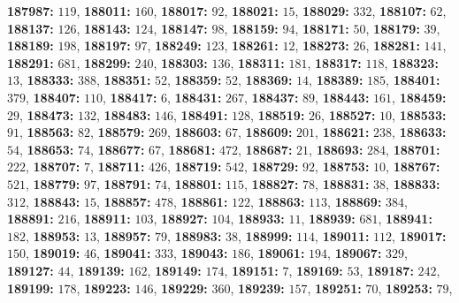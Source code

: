 \textsf{\bfseries 187987:} $119$, \textsf{\bfseries 188011:} $160$, \textsf{\bfseries 188017:} $92$, \textsf{\bfseries 188021:} $15$, \textsf{\bfseries 188029:} $332$, \textsf{\bfseries 188107:} $62$, \textsf{\bfseries 188137:} $126$, \textsf{\bfseries 188143:} $124$, \textsf{\bfseries 188147:} $98$, \textsf{\bfseries 188159:} $94$, \textsf{\bfseries 188171:} $50$, \textsf{\bfseries 188179:} $39$, \textsf{\bfseries 188189:} $198$, \textsf{\bfseries 188197:} $97$, \textsf{\bfseries 188249:} $123$, \textsf{\bfseries 188261:} $12$, \textsf{\bfseries 188273:} $26$, \textsf{\bfseries 188281:} $141$, \textsf{\bfseries 188291:} $681$, \textsf{\bfseries 188299:} $240$, \textsf{\bfseries 188303:} $136$, \textsf{\bfseries 188311:} $181$, \textsf{\bfseries 188317:} $118$, \textsf{\bfseries 188323:} $13$, \textsf{\bfseries 188333:} $388$, \textsf{\bfseries 188351:} $52$, \textsf{\bfseries 188359:} $52$, \textsf{\bfseries 188369:} $14$, \textsf{\bfseries 188389:} $185$, \textsf{\bfseries 188401:} $379$, \textsf{\bfseries 188407:} $110$, \textsf{\bfseries 188417:} $6$, \textsf{\bfseries 188431:} $267$, \textsf{\bfseries 188437:} $89$, \textsf{\bfseries 188443:} $161$, \textsf{\bfseries 188459:} $29$, \textsf{\bfseries 188473:} $132$, \textsf{\bfseries 188483:} $146$, \textsf{\bfseries 188491:} $128$, \textsf{\bfseries 188519:} $26$, \textsf{\bfseries 188527:} $10$, \textsf{\bfseries 188533:} $91$, \textsf{\bfseries 188563:} $82$, \textsf{\bfseries 188579:} $269$, \textsf{\bfseries 188603:} $67$, \textsf{\bfseries 188609:} $201$, \textsf{\bfseries 188621:} $238$, \textsf{\bfseries 188633:} $54$, \textsf{\bfseries 188653:} $74$, \textsf{\bfseries 188677:} $67$, \textsf{\bfseries 188681:} $472$, \textsf{\bfseries 188687:} $21$, \textsf{\bfseries 188693:} $284$, \textsf{\bfseries 188701:} $222$, \textsf{\bfseries 188707:} $7$, \textsf{\bfseries 188711:} $426$, \textsf{\bfseries 188719:} $542$, \textsf{\bfseries 188729:} $92$, \textsf{\bfseries 188753:} $10$, \textsf{\bfseries 188767:} $521$, \textsf{\bfseries 188779:} $97$, \textsf{\bfseries 188791:} $74$, \textsf{\bfseries 188801:} $115$, \textsf{\bfseries 188827:} $78$, \textsf{\bfseries 188831:} $38$, \textsf{\bfseries 188833:} $312$, \textsf{\bfseries 188843:} $15$, \textsf{\bfseries 188857:} $478$, \textsf{\bfseries 188861:} $122$, \textsf{\bfseries 188863:} $113$, \textsf{\bfseries 188869:} $384$, \textsf{\bfseries 188891:} $216$, \textsf{\bfseries 188911:} $103$, \textsf{\bfseries 188927:} $104$, \textsf{\bfseries 188933:} $11$, \textsf{\bfseries 188939:} $681$, \textsf{\bfseries 188941:} $182$, \textsf{\bfseries 188953:} $13$, \textsf{\bfseries 188957:} $79$, \textsf{\bfseries 188983:} $38$, \textsf{\bfseries 188999:} $114$, \textsf{\bfseries 189011:} $112$, \textsf{\bfseries 189017:} $150$, \textsf{\bfseries 189019:} $46$, \textsf{\bfseries 189041:} $333$, \textsf{\bfseries 189043:} $186$, \textsf{\bfseries 189061:} $194$, \textsf{\bfseries 189067:} $329$, \textsf{\bfseries 189127:} $44$, \textsf{\bfseries 189139:} $162$, \textsf{\bfseries 189149:} $174$, \textsf{\bfseries 189151:} $7$, \textsf{\bfseries 189169:} $53$, \textsf{\bfseries 189187:} $242$, \textsf{\bfseries 189199:} $178$, \textsf{\bfseries 189223:} $146$, \textsf{\bfseries 189229:} $360$, \textsf{\bfseries 189239:} $157$, \textsf{\bfseries 189251:} $70$, \textsf{\bfseries 189253:} $79$, 
